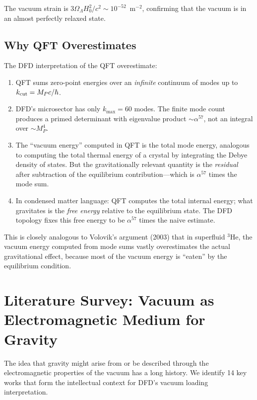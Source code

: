 \documentclass[11pt]{article}
\theoremstyle{plain}
\theoremstyle{definition}
\theoremstyle{remark}
\begin{document}
The vacuum strain is $3\Omega_\Lambda H_0^2/c^2 \sim 10^{-52}$~m$^{-2}$,
confirming that the vacuum is in an almost perfectly relaxed state.

\subsection{Why QFT Overestimates}

The DFD interpretation of the QFT overestimate:
\begin{enumerate}
\item QFT sums zero-point energies over an \emph{infinite} continuum
of modes up to $k_{\rm cut} = M_P c/\hbar$.

\item DFD's microsector has only $k_{\max} = 60$ modes. The finite
mode count produces a primed determinant with eigenvalue product
$\sim \alpha^{57}$, not an integral over $\sim M_P^4$.

\item The ``vacuum energy'' computed in QFT is the total mode energy,
analogous to computing the total thermal energy of a crystal by
integrating the Debye density of states. But the gravitationally
relevant quantity is the \emph{residual} after subtraction of the
equilibrium contribution---which is $\alpha^{57}$ times the mode sum.

\item In condensed matter language: QFT computes the total internal
energy; what gravitates is the \emph{free energy} relative to the
equilibrium state. The DFD topology fixes this free energy to be
$\alpha^{57}$ times the naive estimate.
\end{enumerate}

This is closely analogous to Volovik's argument (2003) that in superfluid
$^3$He, the vacuum energy computed from mode sums vastly overestimates
the actual gravitational effect, because most of the vacuum energy is
``eaten'' by the equilibrium condition.


\section{Literature Survey: Vacuum as Electromagnetic Medium for Gravity}
\label{sec:literature}

The idea that gravity might arise from or be described through the
electromagnetic properties of the vacuum has a long history. We identify
14 key works that form the intellectual context for DFD's vacuum loading
interpretation.
\end{document}
